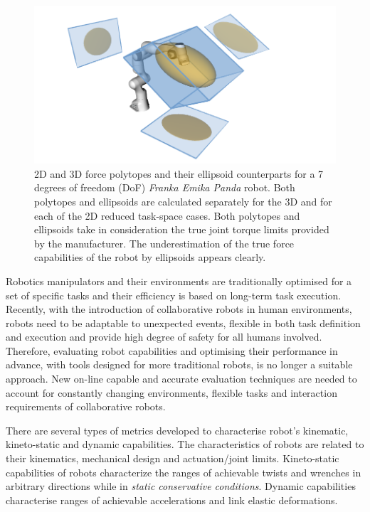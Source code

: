 \begin{figure}[!h]
    \centering
        \includegraphics[width=0.8\linewidth]{Papers/images/polytope_ellipsoid.png}
    \caption{2D and 3D force polytopes and their ellipsoid counterparts for a 7 degrees of freedom (DoF) \textit{Franka Emika Panda} robot. Both polytopes and ellipsoids are calculated separately for the 3D and for each of the 2D reduced task-space cases. Both polytopes and ellipsoids take in consideration the true joint torque limits provided by the manufacturer. The underestimation of the true force capabilities of the robot by ellipsoids appears clearly.}

    \label{fig:polytope_ellipsoid}
    \vspace*{-0.3cm}
\end{figure}

Robotics manipulators and their environments are traditionally optimised for a set of specific tasks and their efficiency is based on long-term task execution. Recently, with the introduction of collaborative robots in human environments, robots need to be adaptable to unexpected events, flexible in both task definition and execution and provide high degree of safety for all humans involved. Therefore, evaluating robot capabilities and optimising their performance in advance, with tools designed for more traditional robots, is no longer a suitable approach. New on-line capable and accurate evaluation techniques are needed to account for constantly changing environments, flexible tasks and interaction requirements of collaborative robots.

There are several types of metrics developed to characterise robot's kinematic, kineto-static and dynamic capabilities. The characteristics of robots are related to their kinematics, mechanical design and actuation/joint limits. Kineto-static capabilities of robots characterize the ranges of achievable twists and wrenches in arbitrary directions while in \textit{static conservative conditions}\cite{angeles_design_2016}. Dynamic capabilities characterise ranges of achievable accelerations and link elastic deformations. 

